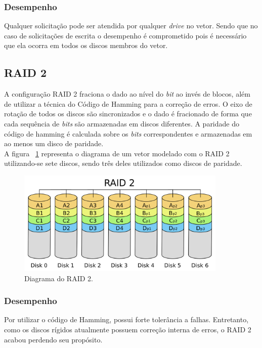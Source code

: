 		\subsubsection{Desempenho}
		
		Qualquer solicitação pode ser atendida por qualquer \textit{drive} no vetor. Sendo que no caso de solicitações de escrita o desempenho é comprometido pois é necessário que ela ocorra em todos os discos membros do vetor. \\
		
		\subsection{RAID 2}
		
		A configuração RAID 2 fraciona o dado ao nível do \textit{bit} ao invés de blocos, além de utilizar a técnica do Código de Hamming para a correção de erros. O eixo de rotação de todos os discos são sincronizados e o dado é fracionado de forma que cada sequência de \textit{bits} são armazenadas em discos diferentes. A paridade do código de hamming é calculada sobre os \textit{bits} correspondentes e armazenadas em ao menos um disco de paridade.\\
		
		A figura ~\ref{fig:raid2} representa o diagrama de um vetor modelado com o RAID 2 utilizando-se sete discos, sendo três deles utilizados como discos de paridade.\\
		
		\begin{figure}[htb]
			\begin{center}
				
				\includegraphics[clip,width=10.0cm]{images/RAID_2.png}
				\caption{Diagrama do RAID 2. }
				\label{fig:raid2}
			\end{center}
		\end{figure} 
		
		\subsubsection{Desempenho}
		Por utilizar o código de Hamming, possui forte tolerância a falhas. Entretanto, como os discos rígidos atualmente possuem correção interna de erros, o RAID 2 acabou perdendo seu propósito. 
	
